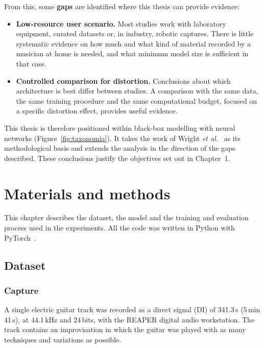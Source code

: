 \documentclass[ENG]{TFUOC}%
\begin{document}
From this, some \textbf{gaps} are identified where this thesis can provide evidence:
\begin{itemize}[nosep]
    \item \textbf{Low-resource user scenario.} Most studies work with laboratory equipment, curated datasets or, in industry, robotic captures. There is little systematic evidence on how much and what kind of material recorded by a musician at home is needed, and what minimum model size is sufficient in that case.
    \item \textbf{Controlled comparison for distortion.} Conclusions about which architecture is best differ between studies. A comparison with the same data, the same training procedure and the same computational budget, focused on a specific distortion effect, provides useful evidence.
\end{itemize}

This thesis is therefore positioned within black-box modelling with neural networks (Figure~\ref{fig:taxonomia}). It takes the work of Wright \emph{et al.}~\cite{wright2019,wright2020,wright2020percep} as its methodological basis and extends the analysis in the direction of the gaps described. These conclusions justify the objectives set out in Chapter~1.



\chapter{Materials and methods}
\label{c:metodes}

This chapter describes the dataset, the model and the training and evaluation process used in the experiments. All the code was written in Python with PyTorch~\cite{paszke2019}.

\section{Dataset}

\subsection{Capture}

A single electric guitar track was recorded as a direct signal (DI) of 341.3\,s (5\,min 41\,s), at 44.1\,kHz and 24\,bits, with the REAPER digital audio workstation. The track contains an improvisation in which the guitar was played with as many techniques and variations as possible.
\end{document}
